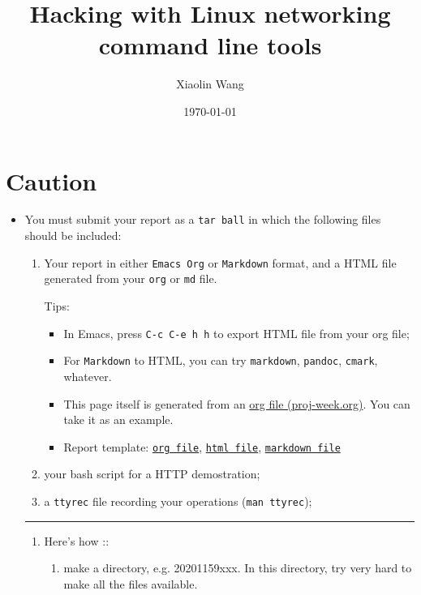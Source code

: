 \documentclass{article} [NO-DEFAULT-PACKAGES] \usepackage{wx672hyperref}
\author{Xiaolin Wang}
\date{\today}
\title{Hacking with Linux networking command line tools}
\begin{document}
\maketitle
\tableofcontents


\section{Caution}
\label{sec:orgbcfde5a}
\begin{itemize}
\item You must submit your report as a \texttt{tar ball} in which the following files should be
included:

\begin{enumerate}
\item Your report in either \texttt{Emacs Org} or \texttt{Markdown} format, and a HTML file
generated from your \texttt{org} or \texttt{md} file.

Tips: 
\begin{itemize}
\item In Emacs, press \texttt{C-c C-e h h} to export HTML file from your org file;

\item For \texttt{Markdown} to HTML, you can try \texttt{markdown}, \texttt{pandoc}, \texttt{cmark}, whatever.

\item This page itself is generated from an \href{proj-week.org}{org file (proj-week.org)}. You can take it
as an example.

\item Report template: \href{20221159xxx.org}{\texttt{org file}}, \href{20221159xxx.html}{\texttt{html file}}, \href{20221159xxx.md}{\texttt{markdown file}}
\end{itemize}

\item your bash script for a HTTP demostration;

\item a \texttt{ttyrec} file recording your operations (\texttt{man ttyrec});
\end{enumerate}

\noindent\rule{\textwidth}{0.5pt}
\begin{enumerate}
\item Here's how :: 
\begin{enumerate}
\item make a directory, e.g. 20201159xxx. In this directory, try very hard to make all
the files available.


\end{enumerate}
\end{enumerate}
\end{itemize}
\end{document}
